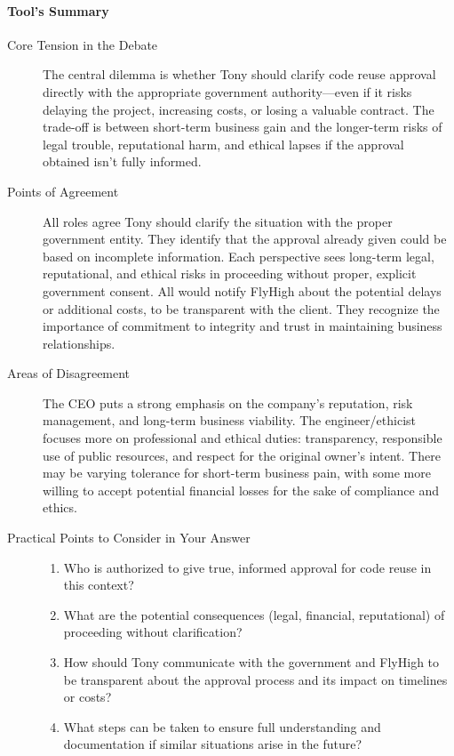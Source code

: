\paragraph{Tool's Summary}{
  \begin{description}
    \item[Core Tension in the Debate] The central dilemma is whether Tony should clarify code reuse approval directly with the appropriate government authority—even if it risks delaying the project, increasing costs, or losing a valuable contract. The trade-off is between short-term business gain and the longer-term risks of legal trouble, reputational harm, and ethical lapses if the approval obtained isn't fully informed.
    \item[Points of Agreement] All roles agree Tony should clarify the situation with the proper government entity.
      They identify that the approval already given could be based on incomplete information.
      Each perspective sees long-term legal, reputational, and ethical risks in proceeding without proper, explicit government consent.
      All would notify FlyHigh about the potential delays or additional costs, to be transparent with the client.
      They recognize the importance of commitment to integrity and trust in maintaining business relationships.
    \item[Areas of Disagreement] The CEO puts a strong emphasis on the company's reputation, risk management, and long-term business viability.
      The engineer/ethicist focuses more on professional and ethical duties: transparency, responsible use of public resources, and respect for the original owner's intent.
      There may be varying tolerance for short-term business pain, with some more willing to accept potential financial losses for the sake of compliance and ethics.
    \item[Practical Points to Consider in Your Answer]{
        \hfill
        \begin{enumerate}[label=(\alph*)]
          \item Who is authorized to give true, informed approval for code reuse in this context?
          \item What are the potential consequences (legal, financial, reputational) of proceeding without clarification?
          \item How should Tony communicate with the government and FlyHigh to be transparent about the approval process and its impact on timelines or costs?
          \item What steps can be taken to ensure full understanding and documentation if similar situations arise in the future?
        \end{enumerate}
      }
  \end{description}
}

